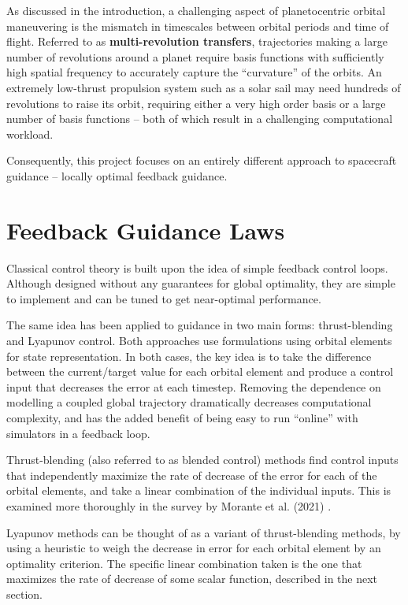 As discussed in the introduction, a challenging aspect of planetocentric orbital maneuvering is the mismatch in timescales between orbital periods and time of flight. Referred to as \textbf{multi-revolution transfers}, trajectories making a large number of revolutions around a planet require basis functions with sufficiently high spatial frequency to accurately capture the ``curvature'' of the orbits. An extremely low-thrust propulsion system such as a solar sail may need hundreds of revolutions to raise its orbit, requiring either a very high order basis or a large number of basis functions -- both of which result in a challenging computational workload.

Consequently, this project focuses on an entirely different approach to spacecraft guidance -- locally optimal feedback guidance.

\section{Feedback Guidance Laws}
Classical control theory is built upon the idea of simple feedback control loops. Although designed without any guarantees for global optimality, they are simple to implement and can be tuned to get near-optimal performance.

The same idea has been applied to guidance in two main forms: thrust-blending and Lyapunov control. Both approaches use formulations using orbital elements for state representation. In both cases, the key idea is to take the difference between the current/target value for each orbital element and produce a control input that decreases the error at each timestep. Removing the dependence on modelling a coupled global trajectory dramatically decreases computational complexity, and has the added benefit of being easy to run ``online'' with simulators in a feedback loop.

Thrust-blending (also referred to as blended control) methods find control inputs that independently maximize the rate of decrease of the error for each of the orbital elements, and take a linear combination of the individual inputs. This is examined more thoroughly in the survey by Morante et al. (2021) \cite{morante2021survey}.

Lyapunov methods can be thought of as a variant of thrust-blending methods, by using a heuristic to weigh the decrease in error for each orbital element by an optimality criterion. The specific linear combination taken is the one that maximizes the rate of decrease of some scalar function, described in the next section.

